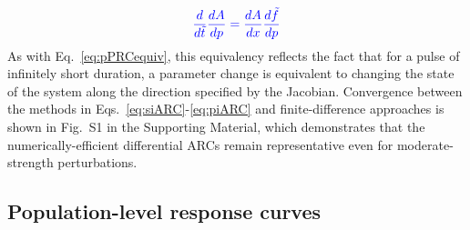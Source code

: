 \documentclass[11pt, letterpaper]{article}
\providecommand{\DIFadd}[1]{{\protect\color{blue}#1}} %
\providecommand{\DIFaddbegin}{} %
\providecommand{\DIFaddend}{} %
\begin{document}
\DIFaddbegin \begin{equation}\DIFadd{
  \frac{d}{d\tilde{t}}\frac{dA}{dp} = \frac{dA}{dx}\frac{d\tilde{f}}{dp}
    \label{eq:piARC}
}\end{equation}
\DIFadd{As with Eq.~\ref{eq:pPRCequiv}, this equivalency reflects the fact that for a pulse of infinitely short duration, a parameter change is equivalent to changing the state of the system along the direction specified by the Jacobian.
}\DIFaddend Convergence between the methods in Eqs.\DIFaddbegin \DIFadd{~}\DIFaddend \ref{eq:siARC}-\ref{eq:piARC} and finite-difference approaches is shown in Fig.\DIFaddbegin \DIFadd{~}\DIFaddend S1 \DIFaddbegin \DIFadd{in the Supporting Material}\DIFaddend , which demonstrates that the numerically-efficient differential ARCs remain representative even for moderate-strength perturbations.

\subsection*{Population-level response curves}
\end{document}
